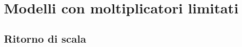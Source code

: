 \chapter{Modelli con moltiplicatori limitati} \label{CAP:quattro}
\section{Ritorno di scala}
\bigskip

